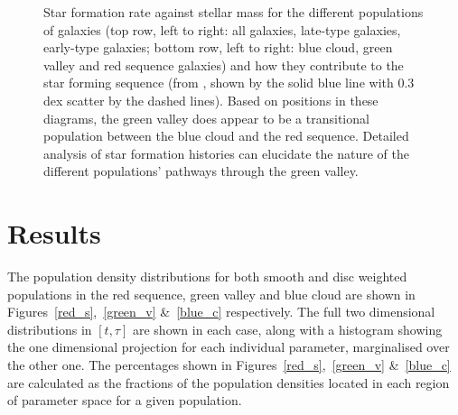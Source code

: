\begin{figure}
\caption[SFR-stellar mass plane split by morphology and colour]{Star formation rate against stellar mass for the different populations of galaxies (top row, left to right: all galaxies, late-type galaxies, early-type galaxies; bottom row, left to right: blue cloud, green valley and red sequence galaxies) and how they contribute to the star forming sequence (from \citet{peng10}, shown by the solid blue line with 0.3 dex scatter by the dashed lines). Based on positions in these diagrams, the green valley does appear to be a transitional population between the blue cloud and the red sequence. Detailed analysis of star formation histories can elucidate the nature of the different populations' pathways through the green valley.}
\label{sfr_mass_sub}
\end{figure}


\section{Results}\label{sec:morphresults}

The population density distributions for both smooth and disc weighted populations in the red sequence, green valley and blue cloud are shown in Figures~\ref{red_s},~\ref{green_v} \&~\ref{blue_c} respectively. The full two dimensional distributions in $[t, \tau]$ are shown in each case, along with a histogram showing the one dimensional projection for each individual parameter, marginalised over the other one. The percentages shown in Figures~\ref{red_s},~\ref{green_v} \&~\ref{blue_c} are calculated as the fractions of the population densities located in each region of parameter space for a given population. 

